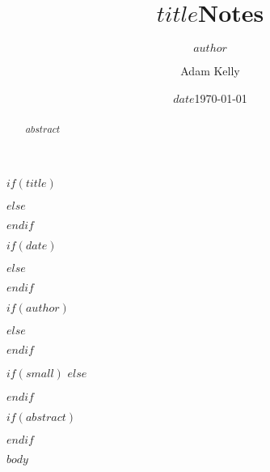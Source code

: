 \documentclass[a4paper,titlepage,onecolumn,superscriptaddress,12pt,unpublished]{quantumarticle} %
\begin{document}
$if(title)$
\title{$title$}
$else$
\title{Notes}
$endif$

$if(date)$
\date{$date$}
$else$
\date{\today}
$endif$

$if(author)$
\author{$author$}
$else$
\author{Adam Kelly}
$endif$

$if(small)$
$else$
\maketitle
$endif$


$if(abstract)$
\begin{abstract}
  $abstract$
\end{abstract}
$endif$

$body$



\end{document}
